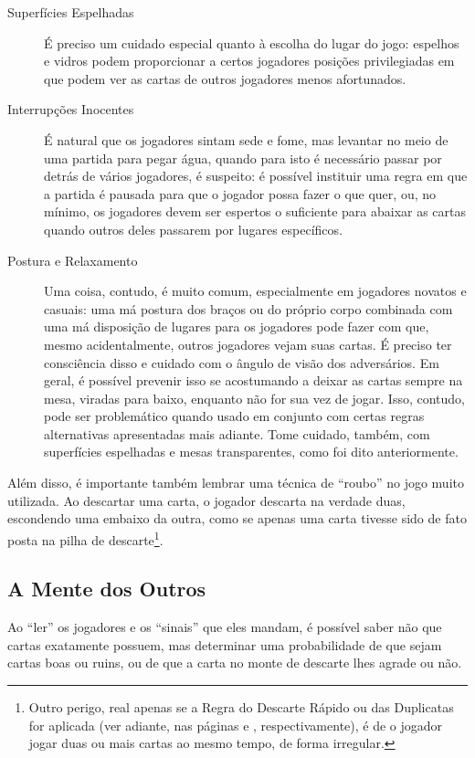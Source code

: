 \begin{description}
\item[Superfícies Espelhadas]{É preciso um cuidado especial quanto à escolha do lugar do jogo: espelhos e vidros podem proporcionar a certos jogadores posições privilegiadas em que podem ver as cartas de outros jogadores menos afortunados.}
\item[Interrupções Inocentes]{É natural que os jogadores sintam sede e fome, mas levantar no meio de uma partida para pegar água, quando para isto é necessário passar por detrás de vários jogadores, é suspeito: é possível instituir uma regra em que a partida é pausada para que o jogador possa fazer o que quer, ou, no mínimo, os jogadores devem ser espertos o suficiente para abaixar as cartas quando outros deles passarem por lugares específicos.}
\item[Postura e Relaxamento]{Uma coisa, contudo, é muito comum, especialmente em jogadores novatos e casuais: uma má postura dos braços ou do próprio corpo combinada com uma má disposição de lugares para os jogadores pode fazer com que, mesmo acidentalmente, outros jogadores vejam suas cartas. É preciso ter consciência disso e cuidado com o ângulo de visão dos adversários. Em geral, é possível prevenir isso se acostumando a deixar as cartas sempre na mesa, viradas para baixo, enquanto não for sua vez de jogar. Isso, contudo, pode ser problemático quando usado em conjunto com certas regras alternativas apresentadas mais adiante. Tome cuidado, também, com superfícies espelhadas e mesas transparentes, como foi dito anteriormente.}
\end{description}

Além disso, é importante também lembrar uma técnica de ``roubo'' no jogo muito utilizada. Ao descartar uma carta, o jogador descarta na verdade duas, escondendo uma embaixo da outra, como se apenas uma carta tivesse sido de fato posta na pilha de descarte\footnote{Outro perigo, real apenas se a Regra do Descarte Rápido ou das Duplicatas for aplicada (ver adiante, nas páginas \pageref{descarterapido} e \pageref{duplicatas}, respectivamente), é de o jogador jogar duas ou mais cartas ao mesmo tempo, de forma irregular.}. 

\subsection{A Mente dos Outros}

Ao ``ler'' os jogadores e os ``sinais'' que eles mandam, é possível saber não que cartas exatamente possuem, mas determinar uma probabilidade de que sejam cartas boas ou ruins, ou de que a carta no monte de descarte lhes agrade ou não.


